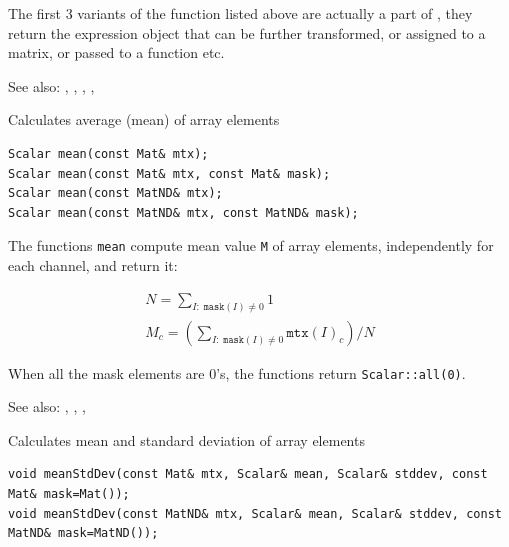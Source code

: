 The first 3 variants of the function listed above are actually a part of , they return the expression object that can be further transformed, or assigned to a matrix, or passed to a function etc.

See also: , , , , 

\label{mean}
Calculates average (mean) of array elements

\begin{lstlisting}
Scalar mean(const Mat& mtx);
Scalar mean(const Mat& mtx, const Mat& mask);
Scalar mean(const MatND& mtx);
Scalar mean(const MatND& mtx, const MatND& mask);
\end{lstlisting}
\begin{description}
\end{description}

The functions \texttt{mean} compute mean value \texttt{M} of array elements, independently for each channel, and return it:

\[
\begin{array}{l}
N = \sum_{I:\;\texttt{mask}(I)\ne 0} 1\\
M_c = \left(\sum_{I:\;\texttt{mask}(I)\ne 0}{\texttt{mtx}(I)_c}\right)/N
\end{array}
\]

When all the mask elements are 0's, the functions return \texttt{Scalar::all(0)}.

See also: , , , 

\label{meanStdDev}
Calculates mean and standard deviation of array elements

\begin{lstlisting}
void meanStdDev(const Mat& mtx, Scalar& mean, Scalar& stddev, const Mat& mask=Mat());
void meanStdDev(const MatND& mtx, Scalar& mean, Scalar& stddev, const MatND& mask=MatND());
\end{lstlisting}
\begin{description}
\end{description}

